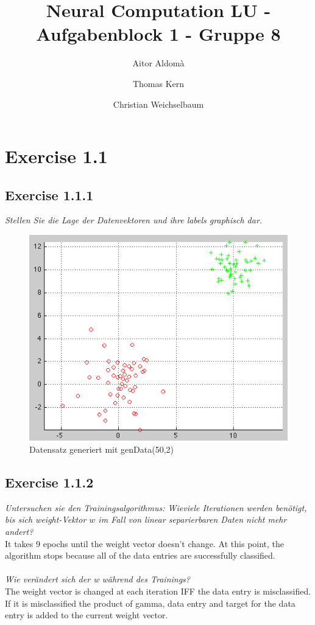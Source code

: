 \documentclass[10pt, journal,compsoc]{article}
\begin{document}
\title{Neural Computation LU - Aufgabenblock 1 - Gruppe 8}


\author{Aitor Aldomà \and Thomas Kern \and Christian Weichselbaum}
        

\section{Exercise 1.1}
\subsection{Exercise 1.1.1}
\textit{Stellen Sie die Lage der Datenvektoren und ihre labels graphisch dar.}

\begin{figure}[htp]
	\centering
	\includegraphics[width=1\textwidth]{ab1_1_1}
	\caption{Datensatz generiert mit genData(50,2)}\label{fig:1}
\end{figure}

\subsection{Exercise 1.1.2}

\textit{Untersuchen sie den Trainingsalgorithmus: Wieviele Iterationen werden benötigt, bis sich weight-Vektor $w$ im Fall von linear separierbaren Daten nicht mehr andert?}
\\
It takes 9 epochs until the weight vector doesn't change. At this point, the algorithm stops because all of the data entries are successfully classified.
\\
\\
\textit{Wie verändert sich der w während des Trainings?}
\\
The weight vector is changed at each iteration IFF the data entry is misclassified. If it is misclassified the product of gamma, data entry and target for the data entry is added to the current weight vector.
\\
\\
\end{document}
